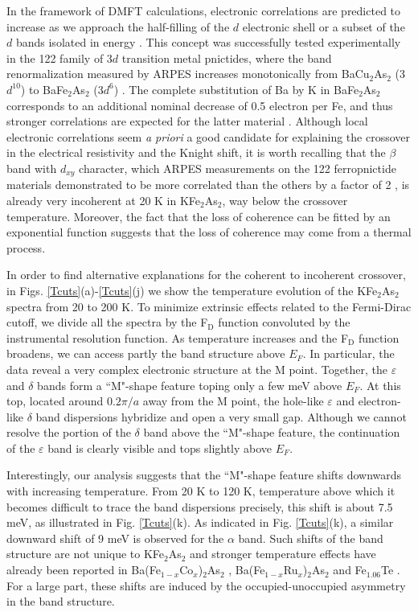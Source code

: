 \documentclass[twocolumn,aps,showpacs,preprintnumbers,amsmath,amssymb, superscriptaddress,longbibliography]{revtex4-1}
\begin{document}
In the framework of DMFT calculations, electronic correlations are predicted to increase as we approach the half-filling of the $d$ electronic shell or a subset of the $d$ bands isolated in energy \cite{HauleNJP11,WernerNatPhys8,deMedici_PRL107,vanRoekeghemCR17}. This concept was successfully tested experimentally in the 122 family of 3$d$ transition metal pnictides, where the band renormalization measured by ARPES increases monotonically from BaCu$_2$As$_2$ (3$d^{10}$) to BaFe$_2$As$_2$ (3$d^6$) \cite{LK_ZengPRB94}. The complete substitution of Ba by K in BaFe$_2$As$_2$ corresponds to an additional nominal decrease of 0.5 electron per Fe, and thus stronger correlations are expected for the latter material \cite{WernerNatPhys8}. Although local electronic correlations seem \textit{a priori} a good candidate for explaining the
crossover in the electrical resistivity and the Knight shift, it is worth recalling that the $\beta$ band with $d_{xy}$ character, which ARPES measurements on the 122 ferropnictide materials demonstrated to be more correlated than the others by a factor of 2 \cite{Nan_XuPRX3}, is already very incoherent at 20 K in KFe$_2$As$_2$, way below the crossover temperature. Moreover, the fact
that the loss of coherence can be fitted by an exponential function suggests that the loss of coherence may come from a thermal process.  

In order to find alternative explanations for the coherent to incoherent crossover, in Figs. \ref{Tcuts}(a)-\ref{Tcuts}(j) we show the temperature evolution of the KFe$_2$As$_2$ spectra from 20 to 200 K.  To minimize extrinsic effects related to the Fermi-Dirac cutoff, we divide all the spectra by the F$_{\textrm{D}}$ function convoluted by the instrumental resolution function. As temperature increases and the F$_{\textrm{D}}$ function broadens, we can access partly the band structure above $E_F$. In particular, the data reveal a very complex electronic structure at the M point. Together, the $\varepsilon$ and $\delta$ bands form a ``M"-shape feature toping only a few meV above $E_F$. At this top, located around $0.2\pi/a$ away from the M point, the hole-like $\varepsilon$ and electron-like $\delta$ band dispersions hybridize and open a very small gap. Although we cannot resolve the portion of the $\delta$ band above the ``M"-shape feature, the continuation of the $\varepsilon$ band is clearly visible and tops slightly above $E_F$. 

Interestingly, our analysis suggests that the ``M"-shape feature shifts downwards with increasing temperature. From 20 K to 120 K, temperature above which it becomes difficult to trace the band dispersions precisely, this shift is about 7.5 meV, as illustrated in Fig. \ref{Tcuts}(k). As indicated in Fig. \ref{Tcuts}(k), a similar downward shift of 9 meV is observed for the $\alpha$ band. Such shifts of the band structure are not unique to KFe$_2$As$_2$ and stronger temperature effects have already been reported in Ba(Fe$_{1-x}$Co$_x$)$_2$As$_2$ \cite{Brouet_PRL110}, Ba(Fe$_{1-x}$Ru$_x$)$_2$As$_2$ \cite{Dhaka_PRL110} and Fe$_{1.06}$Te \cite{PH_LinPRL111}. For a large part, these shifts are induced by the occupied-unoccupied asymmetry in the band structure. 
\end{document}
